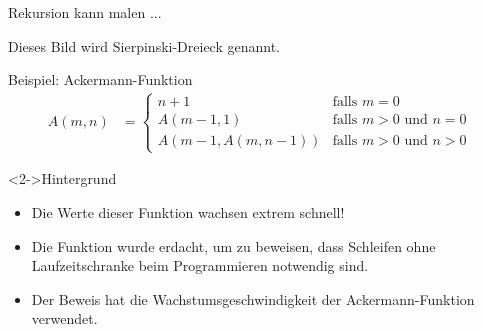 \begin{fframe}
    \begin{block}{Rekursion kann malen ...}
    \end{block}
    \begin{block}{Dieses Bild wird \alert{Sierpinski-Dreieck} genannt.}
    \end{block}
\end{fframe}

\begin{fframe}%
    \begin{block}{Beispiel: Ackermann-Funktion}
    \begin{align*}
        A(m,n) &= \begin{cases}
                      n+1 &\text{falls $m = 0$}\\
                      A(m-1,1) &\text{falls $m > 0$ und $n = 0$}\\
                      A(m-1,A(m,n-1)) &\text{falls $m > 0$ und $n > 0$}
                  \end{cases}
    \end{align*}
    \end{block}
    \begin{block}<2->{Hintergrund}
        \begin{itemize}
            \item Die Werte dieser Funktion wachsen extrem schnell!
            \item Die Funktion wurde erdacht, um zu beweisen,
                  dass Schleifen ohne Laufzeitschranke 
                  beim Programmieren notwendig sind.
            \item Der Beweis hat die Wachstumsgeschwindigkeit
                  der Ackermann-Funktion verwendet.
        \end{itemize}
    \end{block}
\end{fframe}
